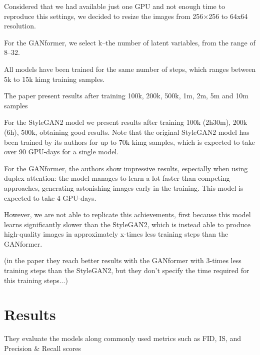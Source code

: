 \documentclass{article}
\begin{document}
	Considered that we had available just one GPU and not enough time to reproduce this settings, we 
	decided to resize the images from 256×256 to 64x64 resolution.
	
	
	For the GANformer, we select k–the number of latent variables, from the range of 8–32. 
	
	All models have been trained for the same number of steps, which ranges between 5k to 15k kimg 
	training samples. 
	
	The paper present results after training 100k, 200k, 500k, 1m, 2m, 5m and 10m samples
	
	For the StyleGAN2 model we present results after training 100k (2h30m), 200k (6h), 500k, obtaining 
	good results.
	Note that the original StyleGAN2 model has been trained by its authors \cite{karras2020analyzing} 
	for up to 70k kimg samples, which is expected to take over 90 GPU-days for a single model. 
	

	For the GANformer, the authors \cite{karras2020analyzing} show impressive results, especially when 
	using duplex attention: the model manages to learn a lot faster than competing approaches, 
	generating astonishing images early in the training. This model is expected to take 4 GPU-days.
	
	However, we are not able to replicate this achievements, first because this model learns significantly 
	slower than the StyleGAN2, which is instead able to produce high-quality images in approximately 
	x-times less training steps than the GANformer.
	
	
	(in the paper they reach better results with the GANformer with 3-times less training steps than the 
	StyleGAN2, but they don't specify the time required for this training steps...)

	\section{Results}
	
	They evaluate the models along commonly used metrics such as FID, IS, and Precision \& Recall 
	scores
	
\end{document}
